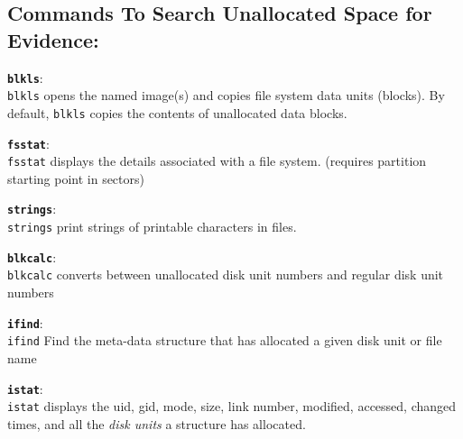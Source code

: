 \documentclass[a4paper,11pt]{article}
\begin{document}
\subsection*{Commands To Search Unallocated Space for Evidence:}
\begin{itemize*}
	\item \textbf{\texttt{blkls}}:\\ \texttt{blkls} opens the named image(s) and copies file system data  units  (blocks).   By default,  \texttt{blkls} copies the contents of unallocated data blocks. 
	\item \textbf{\texttt{fsstat}}:\\ \texttt{fsstat} displays the details associated with a file system. (requires partition starting point in sectors)
	\item \textbf{\texttt{strings}}:\\ \texttt{strings} print strings of printable characters in files.
	\item \textbf{\texttt{blkcalc}}:\\ \texttt{blkcalc} converts between unallocated disk unit numbers and regular disk unit
       numbers
	\item \textbf{\texttt{ifind}}:\\ \texttt{ifind} Find the meta-data structure that has allocated a given disk unit or file
       name
		\item \textbf{\texttt{istat}}:\\ \texttt{istat}  displays the uid, gid, mode, size, link number, modified, accessed, changed times, and all the \textit{disk units} a structure has allocated.
\end{itemize*}
\end{document}
